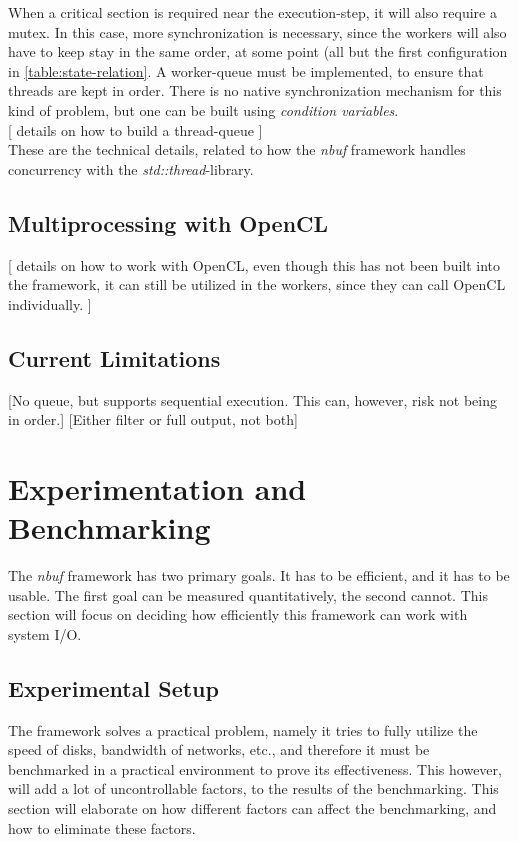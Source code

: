 \documentclass[a4paper]{article}
\newcommand{\nbuf}{\textit{nbuf} }
\begin{document}
When a critical section is required near the execution-step, it will also require a mutex. In this case, more synchronization is necessary, since the workers will also have to keep stay in the same order, at some point (all but the first configuration in \autoref{table:state-relation}. A worker-queue must be implemented, to ensure that threads are kept in order. There is no native synchronization mechanism for this kind of problem, but one can be built using \textit{condition variables}.\\

[ details on how to build a thread-queue ]\\

These are the technical details, related to how the \nbuf framework handles concurrency with the \textit{std::thread}-library.


\subsection{Multiprocessing with OpenCL}
[ details on how to work with OpenCL, even though this has not been built into the framework, it can still be utilized in the workers, since they can call OpenCL individually. ]\\


\subsection{Current Limitations}
[No queue, but supports sequential execution. This can, however, risk not being in order.]
[Either filter or full output, not both]

\newpage
\section{Experimentation and Benchmarking}
The \nbuf framework has two primary goals. It has to be efficient, and it has to be usable. The first goal can be measured quantitatively, the second cannot. This section will focus on deciding how efficiently this framework can work with system I/O. 


\subsection{Experimental Setup}
The framework solves a practical problem, namely it tries to fully utilize the speed of disks, bandwidth of networks, etc., and therefore it must be benchmarked in a practical environment to prove its effectiveness. This however, will add a lot of uncontrollable factors, to the results of the benchmarking. This section will elaborate on how different factors can affect the benchmarking, and how to eliminate these factors.\\
\end{document}
